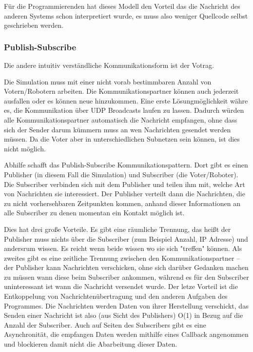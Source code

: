 F{\"{u}}r die Programmierenden hat dieses Modell den Vorteil das die Nachricht des anderen Systems schon
interpretiert wurde, es muss also weniger Quellcode selbst geschrieben werden.

\subsubsection{Publish-Subscribe}
Die andere intuitiv verst{\"{a}}ndliche Kommunikationsform ist der Votrag.

Die Simulation muss mit einer nicht vorab bestimmbaren Anzahl von Votern/Robotern arbeiten.
Die Kommunikationspartner k{\"{o}}nnen auch jederzeit ausfallen oder es k{\"{o}}nnen neue hinzukommen.
Eine erste L{\"{o}}sungm{\"{o}}glichkeit w{\"{a}}hre es, die Kommunikation {\"{u}}ber UDP Broadcasts
laufen zu lassen. Dadurch w{\"{u}}rden alle Kommunikationspartner automatisch die Nachricht empfangen, ohne
dass sich der Sender darum k{\"{u}}mmern muss an wen Nachrichten gesendet werden m{\"{u}}ssen. Da die
Voter aber in unterschiedlichen Subnetzen sein k{\"{o}}nnen, ist dies nicht m{\"{o}}glich.

Abhilfe schafft das Publish-Subscribe Kommunikationspattern\cite{pubsub}. Dort gibt es einen Publisher (in
diesem Fall die Simulation) und Subscriber (die Voter/Roboter). Die Subscriber verbinden sich mit dem
Publisher und teilen ihm mit, welche Art von Nachrichten sie interessiert. Der Publisher verteilt dann die
Nachrichten, die zu nicht vorhersehbaren Zeitpunkten kommen, anhand dieser Informationen an alle Subscriber zu denen momentan ein Kontakt m{\"{o}}glich ist.

Dies hat drei gro{\ss}e Vorteile. Es gibt eine r{\"{a}}umliche Trennung, das hei{\ss}t der Publisher muss
nichts {\"{u}}ber die Subscriber (zum Beispiel Anzahl, IP Adresse) und andersrum wissen. Es reicht
wenn beide wissen wo sie sich "treffen" k{\"{o}}nnen. Als zweites gibt es eine zeitliche Trennung zwischen
den Kommunikationspartner -- der Publisher kann Nachrichten verschicken, ohne sich dar{\"{u}}ber Gedanken
machen zu m{\"{u}}ssen wann diese beim Subscriber ankommen, w{\"{a}}hrend es f{\"{u}}r den Subscriber
uninteressant ist wann die Nachricht versendet wurde. Der letze Vorteil ist die Entkoppelung von
Nachrichten{\"{u}}bertragung und den anderen Aufgaben des Programmes. Die Nachrichten werden Daten
von ihrer Herstellung verschickt, das Senden einer Nachricht ist also (aus Sicht des
Publishers) O(1) in Bezug auf die Anzahl der Subscriber. Auch auf Seiten des Subscribers gibt es eine
Asynchronit{\"{a}}t, die empfangen Daten werden mithilfe eines Callback angenommen und blockieren damit
nicht die Abarbeitung dieser Daten.

